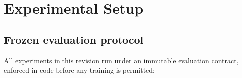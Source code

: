 \section{Experimental Setup}\label{sec:experiments}

\subsection{Frozen evaluation protocol}
\label{sec:protocol}

All experiments in this revision run under an immutable evaluation
contract, enforced in code before any training is permitted:

